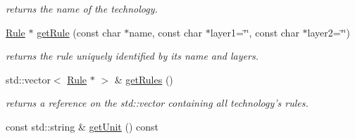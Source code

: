 \begin{DoxyCompactItemize}
\begin{DoxyCompactList}\small\item\em returns the name of the technology. \end{DoxyCompactList}\item 
\hyperlink{class_d_t_r_1_1_rule}{Rule} $\ast$ \hyperlink{class_d_t_r_1_1_techno_a4d56a05b47bd6c51e4e18120f49b584b}{get\-Rule} (const char $\ast$name, const char $\ast$layer1=\char`\"{}\char`\"{}, const char $\ast$layer2=\char`\"{}\char`\"{})
\begin{DoxyCompactList}\small\item\em returns the rule uniquely identified by its name and layers. \end{DoxyCompactList}\item 
std\-::vector$<$ \hyperlink{class_d_t_r_1_1_rule}{Rule} $\ast$ $>$ \& \hyperlink{class_d_t_r_1_1_techno_ac322d0479195cd8a65ff5a922b7f2af7}{get\-Rules} ()
\begin{DoxyCompactList}\small\item\em returns a reference on the std\-::vector containing all technology's rules. \end{DoxyCompactList}\item 
\hypertarget{class_d_t_r_1_1_techno_a4a8ae82fc3348771d0b53d9a3b11652d}{const std\-::string \& \hyperlink{class_d_t_r_1_1_techno_a4a8ae82fc3348771d0b53d9a3b11652d}{get\-Unit} () const }\label{class_d_t_r_1_1_techno_a4a8ae82fc3348771d0b53d9a3b11652d}


\end{DoxyCompactItemize}

